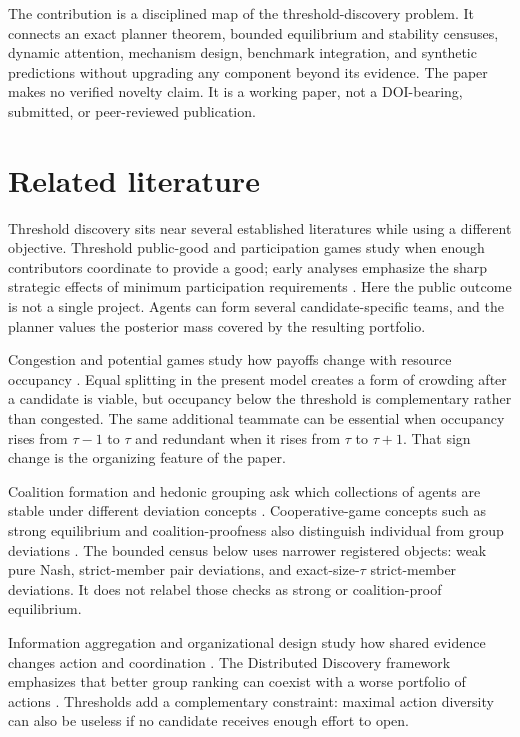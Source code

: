 \documentclass[11pt]{article}
\begin{document}
The contribution is a disciplined map of the threshold-discovery problem. It
connects an exact planner theorem, bounded equilibrium and stability censuses,
dynamic attention, mechanism design, benchmark integration, and synthetic
predictions without upgrading any component beyond its evidence. The paper
makes no verified novelty claim. It is a working paper, not a DOI-bearing,
submitted, or peer-reviewed publication.

\section{Related literature}

Threshold discovery sits near several established literatures while using a
different objective. Threshold public-good and participation games study when
enough contributors coordinate to provide a good; early analyses emphasize
the sharp strategic effects of minimum participation requirements
\citep{PalfreyRosenthal1984,Diekmann1985}. Here the public outcome is not a
single project. Agents can form several candidate-specific teams, and the
planner values the posterior mass covered by the resulting portfolio.

Congestion and potential games study how payoffs change with resource occupancy
\citep{Rosenthal1973,MondererShapley1996}. Equal splitting in the present model creates a form of
crowding after a candidate is viable, but occupancy below the threshold is
complementary rather than congested. The same additional teammate can be
essential when occupancy rises from $\tau-1$ to $\tau$ and redundant when it
rises from $\tau$ to $\tau+1$. That sign change is the organizing feature of
the paper.

Coalition formation and hedonic grouping ask which collections of agents are
stable under different deviation concepts \citep{BogomolnaiaJackson2002}.
Cooperative-game concepts such as strong equilibrium and coalition-proofness
also distinguish individual from group deviations
\citep{Aumann1959,BernheimPelegWhinston1987}. The bounded census below uses
narrower registered objects: weak pure Nash, strict-member pair deviations,
and exact-size-$\tau$ strict-member deviations. It does not relabel those checks
as strong or coalition-proof equilibrium.

Information aggregation and organizational design study how shared evidence
changes action and coordination \citep{MarschakRadner1972,HellwigVeldkamp2009,
MyattWallace2012}. The Distributed Discovery framework emphasizes that better
group ranking can coexist with a worse portfolio of actions
\citep{Nakajima2026SharedDiscovery,WangEtAl2026DistributedDiscovery}. Thresholds
add a complementary constraint: maximal action diversity can also be useless
if no candidate receives enough effort to open.
\end{document}
